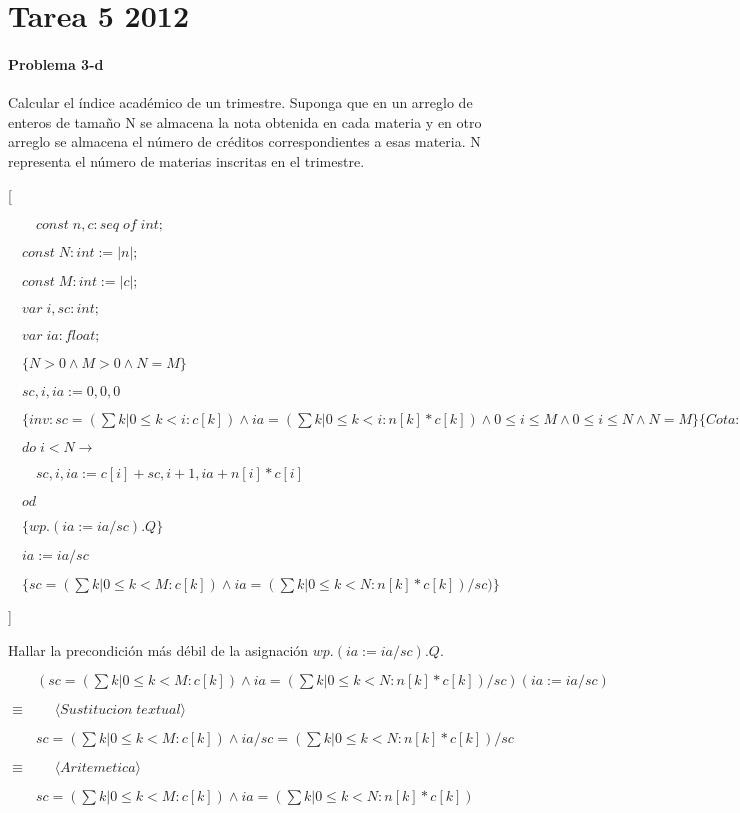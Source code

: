 \documentclass[hidelinks]{article}
\begin{document}
\section*{Tarea 5 2012}

\paragraph{Problema 3-d} \par

Calcular el índice académico de un trimestre. Suponga que en un arreglo de
enteros de tamaño N se almacena la nota obtenida en cada materia y en otro
arreglo se almacena el número de créditos correspondientes a esas materia. N
representa el número de materias inscritas en el trimestre.

[\par
$\quad\quad const\;n,c : seq\;of\;int;$\par
$\quad const\;N : int := |n|;$\par
$\quad const\;M : int := |c|;$\par
$\quad var\;i,sc : int;$\par
$\quad var\;ia : float;$\par
$\quad \{N>0 \land M>0 \land N=M \}$\par
$\quad sc, i, ia := 0,0,0$\par
$\quad \{inv: sc=(\sum k|0 \leq k < i: c[k]) \land ia=(\sum k|0 \leq k < i: n[k]*c[k]) \land 0 \leq i \leq M \land 0 \leq i \leq N \land N=M \}\{Cota: N-i\}$\par
$\quad do \; i < N \rightarrow $\par
$\quad\quad sc, i, ia := c[i]+sc, i + 1, ia+n[i]*c[i]$\par
$\quad od$\par
$\quad \{wp.(ia := ia/sc).Q\}$\par
$\quad ia := ia/sc$\par
$\quad \{sc=(\sum k|0 \leq k < M: c[k]) \land ia=(\sum k|0 \leq k < N: n[k]*c[k])/sc)\}$\par
]\par

Hallar la precondición más débil de la asignación $wp.(ia := ia/sc).Q$.\par

$\qquad (sc=(\sum k|0 \leq k < M: c[k]) \land ia=(\sum k|0 \leq k < N: n[k]*c[k])/sc)(ia := ia/sc)$\par
$\equiv  \qquad \langle Sustitucion \; textual \rangle$\par
$\qquad sc=(\sum k|0 \leq k < M: c[k]) \land ia/sc=(\sum k|0 \leq k < N: n[k]*c[k])/sc$\par
$\equiv  \qquad \langle Aritemetica \rangle$\par
$\qquad sc=(\sum k|0 \leq k < M: c[k]) \land ia=(\sum k|0 \leq k < N: n[k]*c[k])$\par
\end{document}
